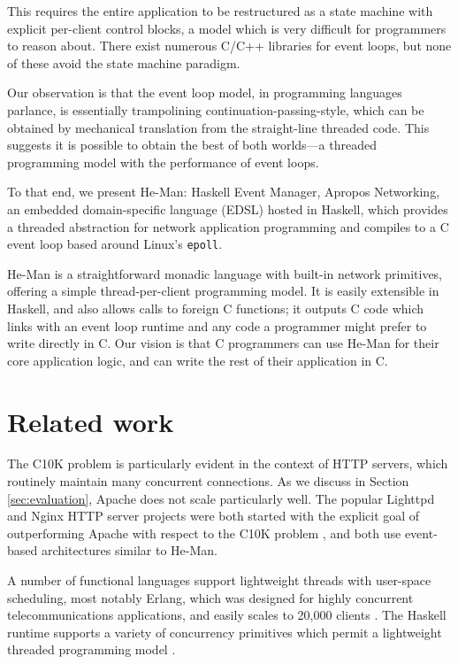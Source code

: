 \documentclass[preprint,11pt]{sigplanconf}
\renewcommand{\t}{\texttt}
\begin{document}
This requires the entire application to be restructured as a state machine with
explicit per-client control blocks, a model which is very difficult for
programmers to reason about. There exist numerous C/C++ libraries for event
loops, but none of these avoid the state machine paradigm.

Our observation is that the event loop model, in programming languages parlance,
is essentially trampolining continuation-passing-style, which can be obtained by
mechanical translation from the straight-line threaded code. This suggests it is
possible to obtain the best of both worlds---a threaded programming model with
the performance of event loops. 

To that end, we present He-Man: Haskell Event Manager, Apropos Networking, an
embedded domain-specific language (EDSL) hosted in Haskell, which provides a
threaded abstraction for network application programming and compiles to a C
event loop based around Linux's \t{epoll}.

He-Man is a straightforward monadic language with built-in network primitives,
offering a simple thread-per-client programming model. It is easily extensible
in Haskell, and also allows calls to foreign C functions; it outputs C code
which links with an event loop runtime and any code a programmer might prefer to
write directly in C. Our vision is that C programmers can use He-Man for their
core application logic, and can write the rest of their application in C. 

\section{Related work}

The C10K problem is particularly evident in the context of HTTP servers, which
routinely maintain many concurrent connections. As we discuss in Section
\ref{sec:evaluation}, Apache does not scale particularly well. The popular
Lighttpd and Nginx HTTP server projects were both started with the explicit goal
of outperforming Apache with respect to the C10K problem \cite{Lighttpd,Nginx},
and both use event-based architectures similar to He-Man. 

A number of functional languages support lightweight threads with user-space
scheduling, most notably Erlang, which was designed for highly concurrent
telecommunications applications, and easily scales to 20,000 clients
\cite{Hellstrom}. The Haskell runtime supports a variety of concurrency
primitives which permit a lightweight threaded programming model \cite{LiEtAl}.
\end{document}
